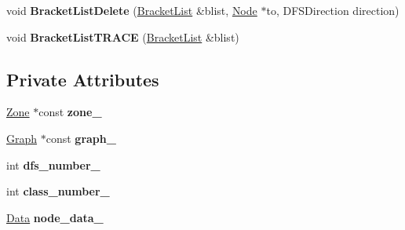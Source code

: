 \begin{DoxyCompactItemize}
\item 
void {\bfseries Bracket\+List\+Delete} (\hyperlink{classv8_1_1internal_1_1_zone_linked_list}{Bracket\+List} \&blist, \hyperlink{classv8_1_1internal_1_1compiler_1_1_node}{Node} $\ast$to, D\+F\+S\+Direction direction)\hypertarget{classv8_1_1internal_1_1compiler_1_1_control_equivalence_a1912c18e287f8b35abb4cdb7ddbbce76}{}\label{classv8_1_1internal_1_1compiler_1_1_control_equivalence_a1912c18e287f8b35abb4cdb7ddbbce76}

\item 
void {\bfseries Bracket\+List\+T\+R\+A\+CE} (\hyperlink{classv8_1_1internal_1_1_zone_linked_list}{Bracket\+List} \&blist)\hypertarget{classv8_1_1internal_1_1compiler_1_1_control_equivalence_add30de2cc706e31ea8102e075f8fe26a}{}\label{classv8_1_1internal_1_1compiler_1_1_control_equivalence_add30de2cc706e31ea8102e075f8fe26a}

\end{DoxyCompactItemize}
\subsection*{Private Attributes}
\begin{DoxyCompactItemize}
\item 
\hyperlink{classv8_1_1internal_1_1_zone}{Zone} $\ast$const {\bfseries zone\+\_\+}\hypertarget{classv8_1_1internal_1_1compiler_1_1_control_equivalence_a3efe8412f49e6034c45f168b990f2acb}{}\label{classv8_1_1internal_1_1compiler_1_1_control_equivalence_a3efe8412f49e6034c45f168b990f2acb}

\item 
\hyperlink{classv8_1_1internal_1_1compiler_1_1_graph}{Graph} $\ast$const {\bfseries graph\+\_\+}\hypertarget{classv8_1_1internal_1_1compiler_1_1_control_equivalence_a782df2f02d5562e9fba41ab8e81e5537}{}\label{classv8_1_1internal_1_1compiler_1_1_control_equivalence_a782df2f02d5562e9fba41ab8e81e5537}

\item 
int {\bfseries dfs\+\_\+number\+\_\+}\hypertarget{classv8_1_1internal_1_1compiler_1_1_control_equivalence_ad51d61a48d670f8a28236426d8ecc96b}{}\label{classv8_1_1internal_1_1compiler_1_1_control_equivalence_ad51d61a48d670f8a28236426d8ecc96b}

\item 
int {\bfseries class\+\_\+number\+\_\+}\hypertarget{classv8_1_1internal_1_1compiler_1_1_control_equivalence_a14c6a1f827bedeffa0511ce08874a377}{}\label{classv8_1_1internal_1_1compiler_1_1_control_equivalence_a14c6a1f827bedeffa0511ce08874a377}

\item 
\hyperlink{classv8_1_1internal_1_1_zone_vector}{Data} {\bfseries node\+\_\+data\+\_\+}\hypertarget{classv8_1_1internal_1_1compiler_1_1_control_equivalence_a09f6fe137350e5e8a7b4b10e9916aae7}{}\label{classv8_1_1internal_1_1compiler_1_1_control_equivalence_a09f6fe137350e5e8a7b4b10e9916aae7}

\end{DoxyCompactItemize}
